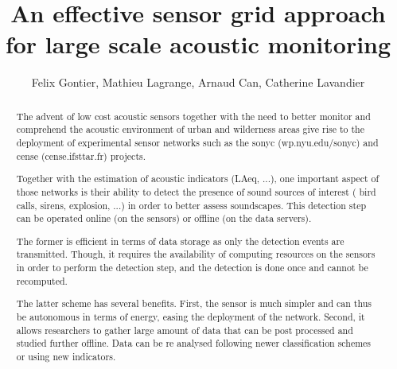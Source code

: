 \documentclass[final,3p,times,twocolumn]{elsarticle}
\begin{document}
\begin{frontmatter}




\title{An effective sensor grid approach for large scale acoustic monitoring}


\author{Felix Gontier, Mathieu Lagrange, Arnaud Can, Catherine Lavandier}

\address{felix.gontier@reseau.eseo.fr\\mathieu.lagrange@cnrs.fr}

\begin{abstract}
The advent of low cost acoustic sensors together with the need to better monitor and comprehend the acoustic environment of urban and wilderness areas give rise to the deployment of experimental sensor networks such as the sonyc (wp.nyu.edu/sonyc) and cense (cense.ifsttar.fr) projects.

Together with the estimation of acoustic indicators (LAeq, ...), one important aspect of those networks is their ability to detect the presence of sound sources of interest ( bird calls, sirens, explosion, ...) in order to better assess soundscapes. This detection step can be operated online (on the sensors) or offline (on the data servers).

The former is efficient in terms of data storage as only the detection events are transmitted. Though, it requires the availability of computing resources on the sensors in order to perform the detection step, and the detection is done once and cannot be recomputed.

The latter scheme has several benefits. First, the sensor is much simpler and can thus be autonomous in terms of energy, easing the deployment of the network. Second, it allows researchers to gather large amount of data that can be post processed and studied further offline. Data can be re analysed following newer classification schemes or using new indicators.


\end{abstract}
\end{frontmatter}
\end{document}
